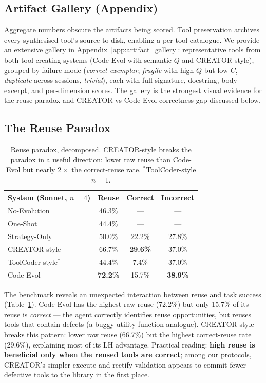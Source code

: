 \documentclass[sigconf,anonymous,review,natbib=false]{acmart}
\begin{document}
\subsection{Artifact Gallery (Appendix)}
\label{sec:artifact_gallery}

Aggregate numbers obscure the artifacts being scored. Tool preservation archives every synthesised tool's source to disk, enabling a per-tool catalogue. We provide an extensive gallery in Appendix~\ref{app:artifact_gallery}: representative tools from both tool-creating systems (Code-Evol with semantic-$Q$ and CREATOR-style), grouped by failure mode (\emph{correct exemplar}, \emph{fragile} with high $Q$ but low $C$, \emph{duplicate} across sessions, \emph{trivial}), each with full signature, docstring, body excerpt, and per-dimension scores. The gallery is the strongest visual evidence for the reuse-paradox and CREATOR-vs-Code-Evol correctness gap discussed below.

\subsection{The Reuse Paradox}
\label{sec:reuse_analysis}

\begin{table}[t]
\centering
\footnotesize
\begin{tabular}{lccc}
\toprule
\textbf{System (Sonnet, $n{=}4$)} & \textbf{Reuse} & \textbf{Correct} & \textbf{Incorrect} \\
\midrule
No-Evolution & 46.3\% & --- & --- \\
One-Shot & 44.4\% & --- & --- \\
Strategy-Only & 50.0\% & 22.2\% & 27.8\% \\
\midrule
CREATOR-style & 66.7\% & \textbf{29.6\%} & 37.0\% \\
ToolCoder-style$^*$ & 44.4\% & 7.4\% & 37.0\% \\
Code-Evol & \textbf{72.2\%} & 15.7\% & \textbf{38.9\%} \\
\bottomrule
\end{tabular}
\caption{Reuse paradox, decomposed. CREATOR-style breaks the paradox in a useful direction: lower raw reuse than Code-Evol but nearly $2\times$ the correct-reuse rate. $^*$ToolCoder-style $n{=}1$.}
\label{tab:reuse}
\end{table}

The benchmark reveals an unexpected interaction between reuse and task success (Table~\ref{tab:reuse}). Code-Evol has the highest raw reuse (72.2\%) but only 15.7\% of its reuse is \emph{correct} --- the agent correctly identifies reuse opportunities, but reuses tools that contain defects (a buggy-utility-function analogue). CREATOR-style breaks this pattern: lower raw reuse (66.7\%) but the highest correct-reuse rate (29.6\%), explaining most of its LH advantage. Practical reading: \textbf{high reuse is beneficial only when the reused tools are correct}; among our protocols, CREATOR's simpler execute-and-rectify validation appears to commit fewer defective tools to the library in the first place.
\end{document}
